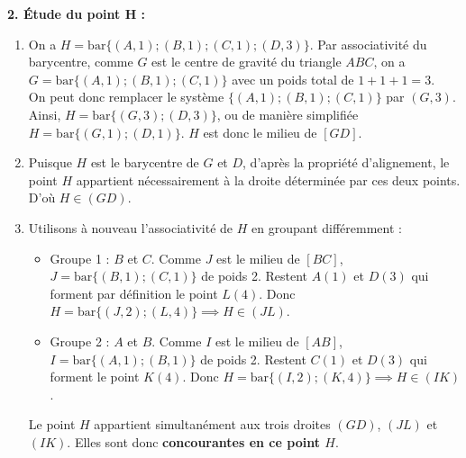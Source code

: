 \documentclass[12pt,a4paper]{article}
\begin{document}
\noindent \textbf{2. Étude du point H :}
\begin{enumerate}
    \item[\textbf{a.}] On a $H=\text{bar}\{(A,1); (B, 1); (C, 1); (D, 3)\}$. Par associativité du barycentre, comme $G$ est le centre de gravité du triangle $ABC$, on a $G=\text{bar}\{(A,1); (B,1); (C,1)\}$ avec un poids total de $1+1+1=3$.\\
    On peut donc remplacer le système $\{(A,1); (B, 1); (C, 1)\}$ par $(G,3)$.\\
    Ainsi, \textbf{$H = \text{bar}\{(G,3); (D,3)\}$}, ou de manière simplifiée \textbf{$H = \text{bar}\{(G,1); (D,1)\}$}. $H$ est donc le milieu de $[GD]$.
    
    \item[\textbf{b.}] Puisque $H$ est le barycentre de $G$ et $D$, d'après la propriété d'alignement, le point $H$ appartient nécessairement à la droite déterminée par ces deux points. D'où \textbf{$H \in (GD)$}.
    
    \item[\textbf{c.}] Utilisons à nouveau l'associativité de $H$ en groupant différemment :
    \begin{itemize}
        \item Groupe 1 : $B$ et $C$. Comme $J$ est le milieu de $[BC]$, $J=\text{bar}\{(B,1);(C,1)\}$ de poids 2. Restent $A(1)$ et $D(3)$ qui forment par définition le point $L(4)$. Donc $H = \text{bar}\{(J,2); (L,4)\} \implies H \in (JL)$.
        \item Groupe 2 : $A$ et $B$. Comme $I$ est le milieu de $[AB]$, $I=\text{bar}\{(A,1);(B,1)\}$ de poids 2. Restent $C(1)$ et $D(3)$ qui forment le point $K(4)$. Donc $H = \text{bar}\{(I,2); (K,4)\} \implies H \in (IK)$.
    \end{itemize}
    Le point $H$ appartient simultanément aux trois droites $(GD)$, $(JL)$ et $(IK)$. Elles sont donc \textbf{concourantes en ce point $H$}.
\end{enumerate}
\end{document}

